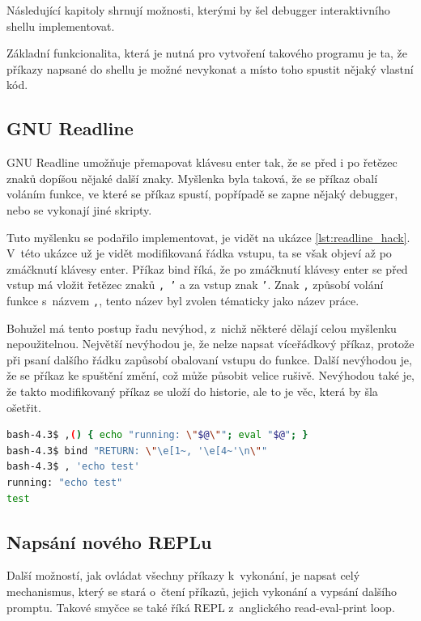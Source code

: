 \documentclass[thesis=M,czech]{FITthesis}[2012/06/26]
\begin{document}
Následující kapitoly shrnují možnosti, kterými by šel debugger interaktivního shellu implementovat.

Základní funkcionalita, která je nutná pro vytvoření takového programu je ta, že příkazy napsané do shellu je možné nevykonat a místo toho spustit nějaký vlastní kód.

\subsection{GNU Readline}

GNU Readline umožňuje přemapovat klávesu enter tak, že se před i po řetězec znaků dopíšou nějaké další znaky. Myšlenka byla taková, že se příkaz obalí voláním funkce, ve které se příkaz spustí, popřípadě se zapne nějaký debugger, nebo se vykonají jiné skripty.

Tuto myšlenku se podařilo implementovat, je vidět na ukázce \ref{lst:readline_hack}. V~této ukázce už je vidět modifikovaná řádka vstupu, ta se však objeví až po zmáčknutí klávesy enter. Příkaz bind říká, že po zmáčknutí klávesy enter se před vstup má vložit řetězec znaků \texttt{, '} a za vstup znak \texttt{'}. Znak \texttt{,} způsobí volání funkce s~názvem \texttt{,}, tento název byl zvolen tématicky jako název práce.

Bohužel má tento postup řadu nevýhod, z~nichž některé dělají celou myšlenku nepoužitelnou. Největší nevýhodou je, že nelze napsat víceřádkový příkaz, protože při psaní dalšího řádku zapůsobí obalovaní vstupu do funkce. Další nevýhodou je, že se příkaz ke spuštění změní, což může působit velice rušivě. Nevýhodou také je, že takto modifikovaný příkaz se uloží do historie, ale to je věc, která by šla ošetřit.

\noindent
\begin{minipage}{\linewidth}
\begin{lstlisting}[language=bash, caption={Modifikace Readline}, label={lst:readline_hack}]
bash-4.3$ ,() { echo "running: \"$@\""; eval "$@"; }
bash-4.3$ bind "RETURN: \"\e[1~, '\e[4~'\n\""
bash-4.3$ , 'echo test'
running: "echo test"
test
\end{lstlisting}
\end{minipage}

%
%
\subsection{Napsání nového REPLu}

Další možností, jak ovládat všechny příkazy k~vykonání, je napsat celý mechanismus, který se stará o~čtení příkazů, jejich vykonání a vypsání dalšího promptu. Takové smyčce se také říká REPL z~anglického read-eval-print loop.
\end{document}
